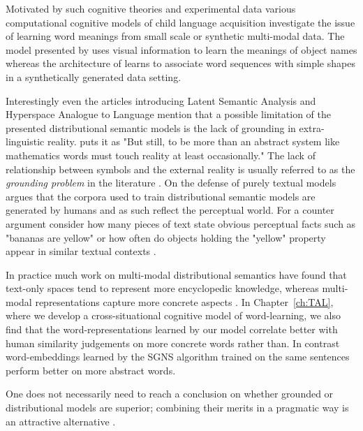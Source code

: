 Motivated by such cognitive theories and experimental data 
various computational cognitive models of child 
language acquisition investigate the issue
of learning word meanings from small scale or synthetic multi-modal data. The model presented by
\cite{yu2005emergence} uses visual information to learn the meanings of object
names whereas the architecture of \cite{roy2002learning} learns to associate word sequences
with simple shapes in a synthetically generated data setting.

Interestingly even the articles introducing Latent Semantic Analysis
\citep{landauer1997solution} and Hyperspace Analogue to Language \citep{lund1996producing} mention
that a possible limitation of the presented distributional semantic models is the lack of
grounding in extra-linguistic reality. \cite{landauer1997solution} puts it as "But still, to be more than
an abstract system like mathematics words must touch reality at least occasionally."
The lack of relationship between symbols and the external reality is usually referred
to as the \emph{grounding problem} in the literature \citep{harnad1990symbol,perfetti1998limits}.
On the defense of purely textual models \cite{louwerse2011symbol} argues that the corpora
used to train distributional semantic models are generated by humans and as such reflect the perceptual world.
For a counter argument consider how many pieces of text state obvious perceptual
facts such as "bananas are yellow" or how often do objects holding the "yellow" property
appear in similar textual contexts \citep{bruni2014multimodal}.

In practice much work on multi-modal distributional semantics have found that text-only spaces tend to
represent more encyclopedic knowledge, whereas multi-modal representations capture more concrete aspects
\citep{andrews2009integrating,baroni2008concepts}. In Chapter~\ref{ch:TAL}, where we develop
a cross-situational cognitive model of word-learning, we also find that the word-representations learned by
our model correlate better with human similarity judgements on more concrete words rather than.
In contrast word-embeddings learned by the SGNS algorithm trained on the same sentences
perform better on more abstract words.

One does not necessarily need to reach a conclusion on whether grounded or distributional 
models are superior;  combining their merits in a
pragmatic way is an attractive alternative \citep{riordan2011redundancy}. 


